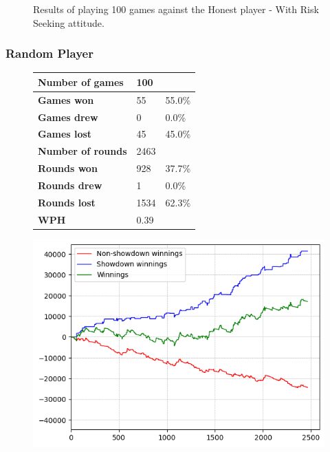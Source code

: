 \begin{figure}[H]
\begin{minipage}{\textwidth}
\begin{minipage}{0.5\textwidth}
        \end{minipage}
    \end{minipage}
    \caption{Results of playing 100 games against the Honest player - With Risk Seeking attitude.}
    \label{fig:results_seeking_honest}
\end{figure}

\subsubsection{Random Player}
\begin{figure}[H]
    \centering
    \begin{minipage}{\textwidth}
        \begin{minipage}{0.40\textwidth}
            \begin{tabular}{|l|l|l|}
                \hline
                \textbf{Number of games}  & 100   &        \\ \hline
                \textbf{Games won}        & 55    & 55.0\% \\ \hline
                \textbf{Games drew}       & 0     & 0.0\%  \\ \hline
                \textbf{Games lost}       & 45    & 45.0\% \\ \hline
                \textbf{Number of rounds} & 2463  &        \\ \hline
                \textbf{Rounds won}       & 928   & 37.7\%  \\ \hline
                \textbf{Rounds drew}      & 1     & 0.0\%  \\ \hline
                \textbf{Rounds lost}      & 1534  & 62.3\% \\ \hline
                \textbf{WPH}              & 0.39 &        \\ \hline
            \end{tabular}
        \end{minipage}
        \hspace{0.05\textwidth}
        \begin{minipage}{0.5\textwidth}
            \includegraphics[width=\textwidth]{graphics/risk-seeking/random.png}

\end{minipage}
\end{minipage}
\end{figure}
